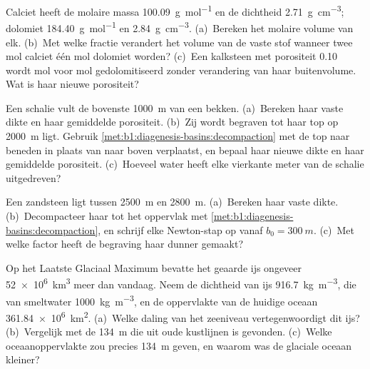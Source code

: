 \begin{exercise}[$\star$]\label{exo:b1:diagenesis-basins:4}
Calciet heeft de molaire massa \qty{100.09}{g.mol^{-1}} en de dichtheid \qty{2.71}{g.cm^{-3}}; dolomiet \qty{184.40}{g.mol^{-1}} en \qty{2.84}{g.cm^{-3}}. (a)~Bereken het molaire volume van elk. (b)~Met welke fractie verandert het volume van de vaste stof wanneer twee mol calciet één mol dolomiet worden? (c)~Een kalksteen met porositeit \num{0.10} wordt mol voor mol gedolomitiseerd zonder verandering van haar buitenvolume. Wat is haar nieuwe porositeit?
\end{exercise}

\begin{exercise}[$\star\star$]\label{exo:b1:diagenesis-basins:5}
Een schalie vult de bovenste \qty{1000}{m} van een bekken. (a)~Bereken haar vaste dikte en haar gemiddelde porositeit. (b)~Zij wordt begraven tot haar top op \qty{2000}{m} ligt. Gebruik \cref{met:b1:diagenesis-basins:decompaction} met de top naar beneden in plaats van naar boven verplaatst, en bepaal haar nieuwe dikte en haar gemiddelde porositeit. (c)~Hoeveel water heeft elke vierkante meter van de schalie uitgedreven?
\end{exercise}

\begin{exercise}[$\star\star$]\label{exo:b1:diagenesis-basins:6}
Een zandsteen ligt tussen \qty{2500}{m} en \qty{2800}{m}. (a)~Bereken haar vaste dikte. (b)~Decompacteer haar tot het oppervlak met \cref{met:b1:diagenesis-basins:decompaction}, en schrijf elke Newton-stap op vanaf $b_0 = \qty{300}{m}$. (c)~Met welke factor heeft de begraving haar dunner gemaakt?
\end{exercise}

\begin{exercise}[$\star\star$]\label{exo:b1:diagenesis-basins:7}
Op het Laatste Glaciaal Maximum bevatte het geaarde ijs ongeveer \qty{52e6}{km^3} meer dan vandaag. Neem de dichtheid van ijs \qty{916.7}{kg.m^{-3}}, die van smeltwater \qty{1000}{kg.m^{-3}}, en de oppervlakte van de huidige oceaan \qty{361.84e6}{km^2}. (a)~Welke daling van het zeeniveau vertegenwoordigt dit ijs? (b)~Vergelijk met de \qty{134}{m} die uit oude kustlijnen is gevonden. (c)~Welke oceaanoppervlakte zou precies \qty{134}{m} geven, en waarom was de glaciale oceaan kleiner?
\end{exercise}

